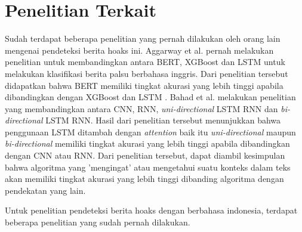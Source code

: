 \section{Penelitian Terkait}
\label{sec:penelitianterkait}

Sudah terdapat beberapa penelitian yang pernah dilakukan oleh orang lain mengenai pendeteksi berita hoaks ini. Aggarway et al. pernah melakukan penelitian untuk membandingkan antara BERT, XGBoost dan LSTM untuk melakukan klasifikasi berita palsu berbahasa inggris. Dari penelitian tersebut didapatkan bahwa BERT memiliki tingkat akurasi yang lebih tinggi apabila dibandingkan dengan XGBoost dan LSTM \cite{bert_news_classi}. Bahad et al. melakukan penelitian yang membandingkan antara CNN, RNN, \textit{uni-directional} LSTM RNN dan \textit{bi-directional} LSTM RNN. Hasil dari penelitian tersebut menunjukkan bahwa penggunaan LSTM ditambah dengan \textit{attention} baik itu \textit{uni-directional} maupun \textit{bi-directional} memiliki tingkat akurasi yang lebih tinggi apabila dibandingkan dengan CNN atau RNN. Dari penelitian tersebut, dapat diambil kesimpulan bahwa algoritma yang 'mengingat' atau mengetahui suatu konteks dalam teks akan memiliki tingkat akurasi yang lebih tinggi dibanding algoritma dengan pendekatan yang lain.

Untuk penelitian pendeteksi berita hoaks dengan berbahasa indonesia, terdapat beberapa penelitian yang sudah pernah dilakukan.
